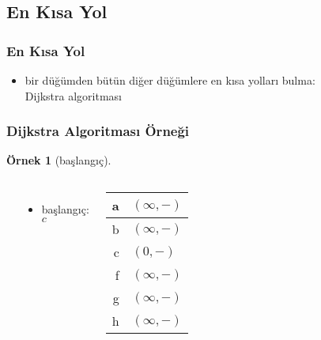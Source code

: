 \documentclass[dvipsnames]{beamer}
\theoremstyle{definition}
\theoremstyle{example}
\newtheorem{ornek}[theorem]{Örnek}
\theoremstyle{plain}
\begin{document}
\subsection{En Kısa Yol}

\begin{frame}
  \frametitle{En Kısa Yol}

  \begin{itemize}
    \item bir düğümden bütün diğer düğümlere en kısa yolları bulma:\\
      Dijkstra algoritması
  \end{itemize}
\end{frame}

\begin{frame}
  \frametitle{Dijkstra Algoritması Örneği}

  \begin{ornek}[başlangıç]
    \begin{columns}
      \begin{center}
      \end{center}

      \begin{itemize}
        \item başlangıç: $c$
      \end{itemize}

      \begin{table}
        \begin{tabular}{r|l}
          a & $(\infty,-)$ \\\hline
          b & $(\infty,-)$ \\\hline
          c & $(0,-)$      \\\hline
          f & $(\infty,-)$ \\\hline
          g & $(\infty,-)$ \\\hline
          h & $(\infty,-)$
        \end{tabular}
      \end{table}
    \end{columns}
  \end{ornek}
\end{frame}
\end{document}
